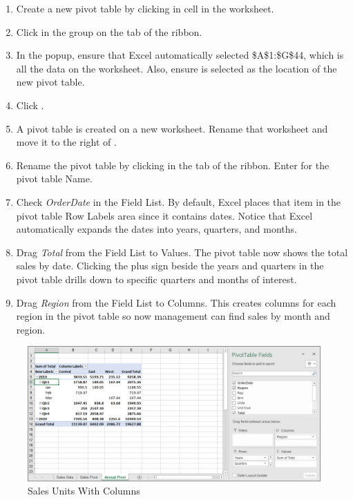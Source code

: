 \begin{enumerate}[resume]
	\item Create a new pivot table by clicking in cell  in the  worksheet.
	\item Click  in the  group on the  tab of the ribbon. 
	\item In the  popup, ensure that Excel automatically selected \$A\$1:\$G\$44, which is all the data on the worksheet. Also, ensure  is selected as the location of the new pivot table. 
	\item Click .
	\item A pivot table is created on a new worksheet. Rename that worksheet  and move it to the right of .
	\item Rename the pivot table by clicking  in the  tab of the ribbon. Enter  for the pivot table Name.
	\item Check \textit{OrderDate} in the Field List. By default, Excel places that item in the pivot table Row Labels area since it contains dates. Notice that Excel automatically expands the dates into years, quarters, and months.
	\item Drag \textit{Total} from the Field List to Values. The pivot table now shows the total sales by date. Clicking the plus sign beside the years and quarters in the pivot table drills down to specific quarters and months of interest.
	\item Drag \textit{Region} from the Field List to Columns. This creates columns for each region in the pivot table so now management can find sales by month and region.
	\end{enumerate}	

	\begin{figure}[H]
	\centering
	\includegraphics[width=\maxwidth{.95\linewidth}]{gfx/ch07_fig21}
	\caption{Sales Units With Columns}
	\label{07:fig21}
	\end{figure}

